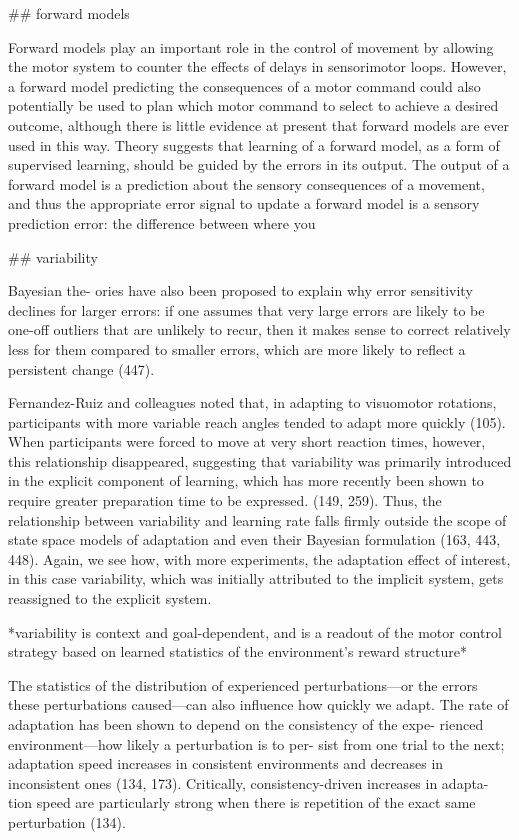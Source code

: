 \documentclass[../main.tex]{subfiles}
\begin{document}
{{## forward models

Forward models play an important role in the control of movement by allowing the motor system to counter the effects of delays in sensorimotor loops. However, a forward model predicting the consequences of a motor command could also potentially be used to plan which motor command to select to achieve a desired outcome, although there is little evidence at present that forward models are ever used in this way.
Theory suggests that learning of a forward model, as a form of supervised learning, should be guided by the errors in its output. The output of a forward model is a prediction about the sensory consequences of a movement, and thus the appropriate error signal to update a forward model is a sensory prediction error: the difference between where you

## variability

Bayesian the- ories have also been proposed to explain why error sensitivity declines for larger errors: if one assumes that very large errors are likely to be one-off outliers that are unlikely to recur, then it makes sense to correct relatively less for them compared to smaller errors, which are more likely to reflect a persistent change (447).

Fernandez-Ruiz and colleagues noted that, in adapting to visuomotor rotations, participants with more variable reach angles tended to adapt more quickly (105). When participants were forced to move at very short reaction times, however, this relationship disappeared, suggesting that variability was primarily introduced in the explicit component of learning, which has more recently been shown to require greater preparation time to be expressed. (149, 259). Thus, the relationship between variability and learning rate falls firmly outside the scope of state space models of adaptation and even their Bayesian formulation (163, 443, 448). Again, we see how, with more experiments, the adaptation effect of interest, in this case variability, which was initially attributed to the implicit system, gets reassigned to the explicit system.

*variability is context and goal-dependent, and is a readout of the motor control strategy based on learned statistics of the environment's reward structure*

The statistics of the distribution of experienced perturbations—or the errors these perturbations caused—can also influence how quickly we adapt. The rate of adaptation has been shown to depend on the consistency of the expe- rienced environment—how likely a perturbation is to per- sist from one trial to the next; adaptation speed increases in consistent environments and decreases in inconsistent ones (134, 173). Critically, consistency-driven increases in adapta- tion speed are particularly strong when there is repetition of the exact same perturbation (134).

}}
\end{document}
